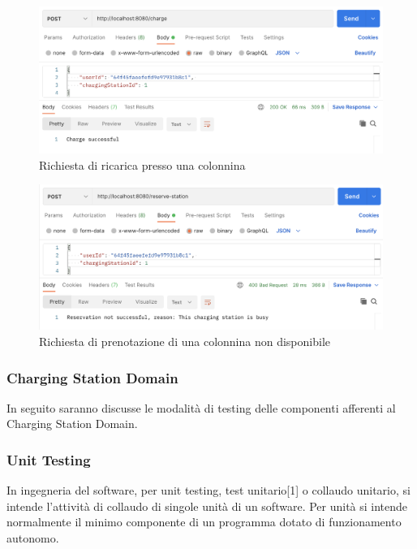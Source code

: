 \begin{figure}[htbp]
  \centering
  \includegraphics[width=\textwidth]{images/askCharge.png}
  \caption{Richiesta di ricarica presso una colonnina}
  \label{fig:askCharge}
\end{figure}

\begin{figure}[htbp]
  \centering
  \includegraphics[width=\textwidth]{images/reserveNotOk.png}
  \caption{Richiesta di prenotazione di una colonnina non disponibile}
  \label{fig:reserveNotOk}
\end{figure}

\subsubsection{Charging Station Domain}
In seguito saranno discusse le modalità di testing delle componenti afferenti al Charging Station Domain.\\

\subsubsection{Unit Testing}
In ingegneria del software, per unit testing, test unitario[1] o collaudo unitario, si intende
l'attività di collaudo di singole unità di un software. Per unità si intende normalmente il minimo
componente di un programma dotato di funzionamento autonomo.\\

